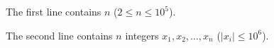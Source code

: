 The first line contains $n$ ($2 \le n \le 10^5$).

The second line contains $n$ integers $x_1, x_2, \ldots, x_n$ ($|x_i| \le 10^6$).

